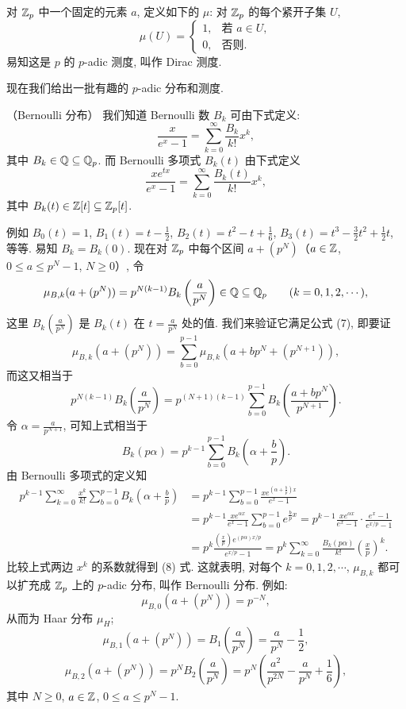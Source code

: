 \begin{example}
对 $\mathbb{Z}_p$ 中一个固定的元素 $a$, 定义如下的 $\mu$: 对 $\mathbb{Z}_p$ 的每个紧开子集 $U$,
\[
  \mu(U)=\begin{cases}
    1, & \text{若 } a\in U,\\
    0, & \text{否则}.
  \end{cases}
\]
易知这是 $p$ 的 $p$-adic 测度, 叫作 Dirac 测度.
\end{example}

现在我们给出一批有趣的 $p$-adic 分布和测度.

\begin{example}（Bernoulli 分布）
我们知道 Bernoulli 数 $B_k$ 可由下式定义:
\[
  \frac{x}{e^x-1}=\sum_{k=0}^{\infty}\frac{B_k}{k!}x^k,
\]
其中 $B_k\in\mathbb{Q}\subseteq\mathbb{Q}_p$. 而 Bernoulli 多项式 $B_k(t)$ 由下式定义
\[
  \frac{xe^{tx}}{e^x-1}=\sum_{k=0}^{\infty}\frac{B_k(t)}{k!}x^k,
\]
其中 $B_k(t)\in\mathbb{Z}[t]\subseteq\mathbb{Z}_p[t]$.

例如 $B_0(t)=1$, $B_1(t)=t-\frac{1}{2}$, $B_2(t)=t^2-t+\frac{1}{6}$, $B_3(t)=t^3-\frac{3}{2}t^2+\frac{1}{2}t$, 等等. 易知 $B_k=B_k(0)$. 现在对 $\mathbb{Z}_p$ 中每个区间 $a+(p^N)$（$a\in\mathbb{Z}$, $0\leqslant a\leqslant p^N-1$, $N\geqslant 0$）, 令
\[
  \mu_{B,k}(a+(p^N))=p^{N(k-1)}B_k\left(\frac{a}{p^N}\right)
  \in\mathbb{Q}\subseteq\mathbb{Q}_p\qquad(k=0,1,2,\cdots),
\]
这里 $B_k\left(\frac{a}{p^N}\right)$ 是 $B_k(t)$ 在 $t=\frac{a}{p^N}$ 处的值. 我们来验证它满足公式 (7), 即要证
\[
  \mu_{B,k}(a+(p^N))
  =\sum_{b=0}^{p-1}\mu_{B,k}(a+bp^N+(p^{N+1})),
\]
而这又相当于
\[
  p^{N(k-1)}B_k\left(\frac{a}{p^N}\right)
  =p^{(N+1)(k-1)}\sum_{b=0}^{p-1}B_k\left(\frac{a+bp^N}{p^{N+1}}\right).
\]
令 $\alpha=\frac{a}{p^{N+1}}$, 可知上式相当于
\begin{equation}\tag{8}
  B_k(p\alpha)=p^{k-1}\sum_{b=0}^{p-1}B_k\left(\alpha+\frac{b}{p}\right).
\end{equation}
由 Bernoulli 多项式的定义知
\[
  \begin{aligned}
    p^{k-1}\sum_{k=0}^{\infty}\frac{x^k}{k!}\sum_{b=0}^{p-1}B_k\left(\alpha+\frac{b}{p}\right)
    &=p^{k-1}\sum_{b=0}^{p-1}\frac{xe^{\left(\alpha+\frac{b}{p}\right)x}}{e^x-1}\\
    &=p^{k-1}\frac{xe^{\alpha x}}{e^x-1}\sum_{b=0}^{p-1}e^{\frac{b}{p}x}
    =p^{k-1}\frac{xe^{\alpha x}}{e^x-1}\cdot\frac{e^x-1}{e^{x/p}-1}\\
    &=p^k\frac{\left(\frac{x}{p}\right)e^{(p\alpha)x/p}}{e^{x/p}-1}
    =p^k\sum_{k=0}^{\infty}\frac{B_k(p\alpha)}{k!}\left(\frac{x}{p}\right)^k.
  \end{aligned}
\]
比较上式两边 $x^k$ 的系数就得到 (8) 式. 这就表明, 对每个 $k=0,1,2,\cdots$, $\mu_{B,k}$ 都可以扩充成 $\mathbb{Z}_p$ 上的 $p$-adic 分布, 叫作 Bernoulli 分布. 例如:
\[
  \mu_{B,0}(a+(p^N))=p^{-N},
\]
从而为 Haar 分布 $\mu_H$;
\[
  \mu_{B,1}(a+(p^N))=B_1\left(\frac{a}{p^N}\right)
  =\frac{a}{p^N}-\frac{1}{2},
\]
\[
  \mu_{B,2}(a+(p^N))=p^NB_2\left(\frac{a}{p^N}\right)
  =p^N\left(\frac{a^2}{p^{2N}}-\frac{a}{p^N}+\frac{1}{6}\right),
\]
其中 $N\geqslant 0$, $a\in\mathbb{Z}$, $0\leqslant a\leqslant p^N-1$.
\end{example}

